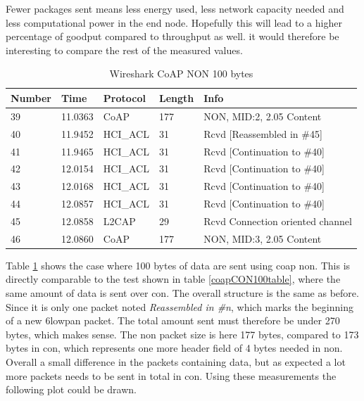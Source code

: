 \noindent Fewer packages sent means less energy used, less network capacity needed and less computational power in the end node. Hopefully this will lead to a higher percentage of goodput compared to throughput as well. it would therefore be interesting to compare the rest of the measured values.

\begin{table}[H]
\small
\centering
\caption{Wireshark CoAP NON 100 bytes}
\label{coapNON100table}
\begin{tabular}{lllll}
\hline
Number & Time    & Protocol & Length & Info   							  \\ \hline                          
39     & 11.0363 & CoAP     & 177    & NON, MID:2, 2.05 Content         \\
40     & 11.9452 & HCI\_ACL & 31     & Rcvd {[}Reassembled in \#45{]}   \\
41     & 11.9465 & HCI\_ACL & 31     & Rcvd {[}Continuation to \#40{]}  \\
42     & 12.0154 & HCI\_ACL & 31     & Rcvd {[}Continuation to \#40{]}  \\
43     & 12.0168 & HCI\_ACL & 31     & Rcvd {[}Continuation to \#40{]}  \\
44     & 12.0857 & HCI\_ACL & 31     & Rcvd {[}Continuation to \#40{]}  \\
45     & 12.0858 & L2CAP    & 29     & Rcvd Connection oriented channel \\
46     & 12.0860 & CoAP     & 177    & NON, MID:3, 2.05 Content         \\ \hline
\end{tabular}
\end{table}

\noindent Table \ref{coapNON100table} shows the case where 100 bytes of data are sent using \gls{coap} \gls{non}. This is directly comparable to the test shown in table \ref{coapCON100table}, where the same amount of data is sent over \gls{con}. The overall structure is the same as before. Since it is only one packet noted \textit{Reassembled in \#n}, which marks the beginning of a new \gls{6lowpan} packet. The total amount sent must therefore be under 270 bytes, which makes sense. The \gls{non} packet size is here 177 bytes, compared to 173 bytes in \gls{con}, which represents one more header field of 4 bytes needed in \gls{non}. Overall a small difference in the packets containing data, but as expected a lot more packets needs to be sent in total in \gls{con}. Using these measurements the following plot could be drawn. 

